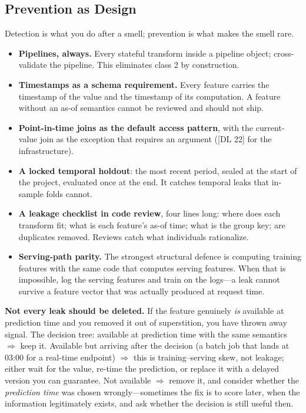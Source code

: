 \subsection{Prevention as Design}

Detection is what you do after a smell; prevention is what makes the smell rare.

\begin{itemize}
    \item \textbf{Pipelines, always.} Every stateful transform inside a pipeline object; cross-validate the pipeline. This eliminates class 2 by construction.
    \item \textbf{Timestamps as a schema requirement.} Every feature carries the timestamp of the value and the timestamp of its computation. A feature without an as-of semantics cannot be reviewed and should not ship.
    \item \textbf{Point-in-time joins as the default access pattern}, with the current-value join as the exception that requires an argument ([DL 22] for the infrastructure).
    \item \textbf{A locked temporal holdout}: the most recent period, sealed at the start of the project, evaluated once at the end. It catches temporal leaks that in-sample folds cannot.
    \item \textbf{A leakage checklist in code review}, four lines long: where does each transform fit; what is each feature's as-of time; what is the group key; are duplicates removed. Reviews catch what individuals rationalize.
    \item \textbf{Serving-path parity.} The strongest structural defence is computing training features with the same code that computes serving features. When that is impossible, log the serving features and train on the logs---a leak cannot survive a feature vector that was actually produced at request time.
\end{itemize}

\begin{warningbox}
\textbf{Not every leak should be deleted.} If the feature genuinely \emph{is} available at prediction time and you removed it out of superstition, you have thrown away signal. The decision tree: available at prediction time with the same semantics $\Rightarrow$ keep it. Available but arriving after the decision (a batch job that lands at 03:00 for a real-time endpoint) $\Rightarrow$ this is training--serving skew, not leakage; either wait for the value, re-time the prediction, or replace it with a delayed version you can guarantee. Not available $\Rightarrow$ remove it, and consider whether the \emph{prediction time} was chosen wrongly---sometimes the fix is to score later, when the information legitimately exists, and ask whether the decision is still useful then.
\end{warningbox}

